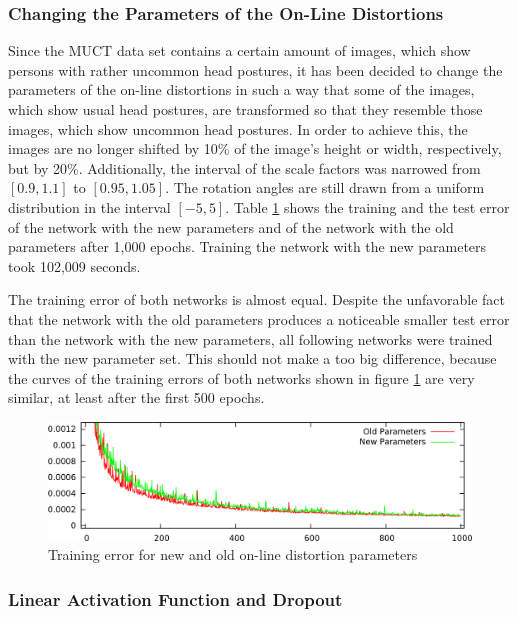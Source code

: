\documentclass[11pt, a4paper]{article}
\begin{document}
\subsubsection{Changing the Parameters of the On-Line Distortions}
\label{subsubsec:newparameters}

Since the \ac{MUCT} data set contains a certain amount of images, which show persons with rather uncommon head postures, it has been decided to change the parameters of the on-line distortions in such a way that some of the images, which show usual head postures, are transformed so that they resemble those images, which show uncommon head postures. In order to achieve this, the images are no longer shifted by 10\% of the image's height or width, respectively, but by 20\%. Additionally, the interval of the scale factors was narrowed from $[0.9,1.1]$ to $[0.95,1.05]$. The rotation angles are still drawn from a uniform distribution in the interval $[-5,5]$. Table \ref{fig:gabor_absatan2_np_vs_op} shows the training and the test error of the network with the new parameters and of the network with the old parameters after 1,000 epochs. Training the network with the new parameters took 102,009 seconds.


The training error of both networks is almost equal. Despite the unfavorable fact that the network with the old parameters produces a noticeable smaller test error than the network with the new parameters, all following networks were trained with the new parameter set. This should not make a too big difference, because the curves of the training errors of both networks shown in figure \ref{fig:gabor_absatan2_np_vs_op} are very similar, at least after the first 500 epochs.

\begin{figure}[h!]
	\centering
	\includegraphics[width=\textwidth]{images/results/gabor_absatan2_np_vs_op.png}
	\caption{Training error for new and old on-line distortion parameters}
	\label{fig:gabor_absatan2_np_vs_op}
\end{figure}

\subsubsection{Linear Activation Function and Dropout}
\end{document}
